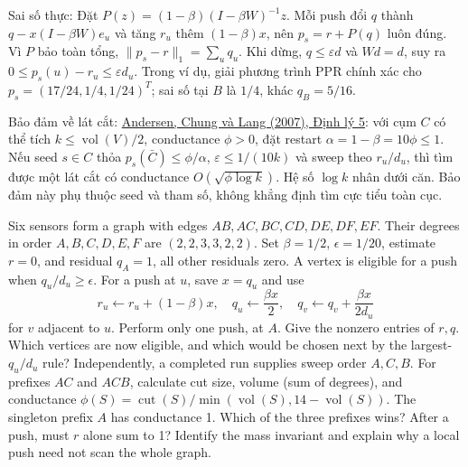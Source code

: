\documentclass[10pt,a4paper,twocolumn]{article}
\newcommand{\key}[1]{#1:\enspace}
\begin{document}
\key{Sai số thực} Đặt $P(z)=(1-\beta)(I-\beta W)^{-1}z$. Mỗi push đổi $q$ thành $q-x(I-\beta W)e_u$ và tăng $r_u$ thêm $(1-\beta)x$, nên $p_s=r+P(q)$ luôn đúng. Vì $P$ bảo toàn tổng, $\|p_s-r\|_1=\sum_u q_u$. Khi dừng, $q\le\varepsilon d$ và $Wd=d$, suy ra $0\le p_s(u)-r_u\le\varepsilon d_u$. Trong ví dụ, giải phương trình PPR chính xác cho $p_s=(17/24,1/4,1/24)^T$; sai số tại $B$ là $1/4$, khác $q_B=5/16$.

\key{Bảo đảm về lát cắt} \href{https://fanchung.ucsd.edu/wp/localpartfull.pdf}{Andersen, Chung và Lang (2007), Định lý 5}: với cụm $C$ có thể tích $k\le\operatorname{vol}(V)/2$, conductance $\phi>0$, đặt restart $\alpha=1-\beta=10\phi\le1$. Nếu seed $s\in C$ thỏa $p_s(\bar C)\le\phi/\alpha$, $\varepsilon\le1/(10k)$ và sweep theo $r_u/d_u$, thì tìm được một lát cắt có conductance $O(\sqrt{\phi\log k})$. Hệ số $\log k$ nhân dưới căn. Bảo đảm này phụ thuộc seed và tham số, không khẳng định tìm cực tiểu toàn cục.

Six sensors form a graph with edges $AB,AC,BC,CD,DE,DF,EF$. Their degrees in order $A,B,C,D,E,F$ are $(2,2,3,3,2,2)$. Set $\beta=1/2$, $\epsilon=1/20$, estimate $r=0$, and residual $q_A=1$, all other residuals zero. A vertex is eligible for a push when $q_u/d_u\ge\epsilon$. For a push at $u$, save $x=q_u$ and use
\[
r_u\gets r_u+(1-\beta)x,\quad
q_u\gets\frac{\beta x}{2},\quad
q_v\gets q_v+\frac{\beta x}{2d_u}
\]
for $v$ adjacent to $u$.
 Perform only one push, at $A$. Give the nonzero entries of $r,q$. Which vertices are now eligible, and which would be chosen next by the largest-$q_u/d_u$ rule?
 Independently, a completed run supplies sweep order $A,C,B$. For prefixes $AC$ and $ACB$, calculate cut size, volume (sum of degrees), and conductance $\phi(S)=\operatorname{cut}(S)/\min(\operatorname{vol}(S),14-\operatorname{vol}(S))$. The singleton prefix $A$ has conductance 1. Which of the three prefixes wins?
 After a push, must $r$ alone sum to 1? Identify the mass invariant and explain why a local push need not scan the whole graph.
\end{document}
